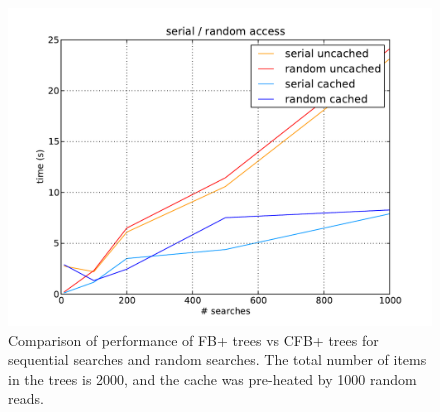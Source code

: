 \documentclass{article}
\begin{document}
\begin{figure}[p]
\begin{center}
\includegraphics[width=350pt]{combs}
\end{center}
\caption{
Comparison of performance of FB+ trees vs CFB+ trees for sequential searches and random searches.
The total number of items in the trees is 2000, and the cache was pre-heated by 1000 random reads.
}
\label{fig:combs}
\end{figure}
\end{document}
